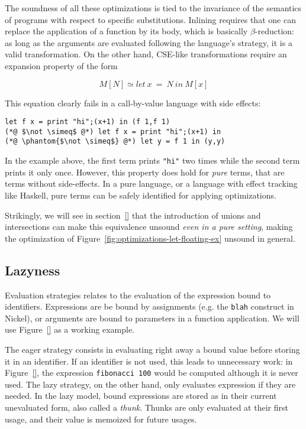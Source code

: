 \documentclass[sigplan,10pt,review,anonymous]{acmart}
\newcommand{\unsure}[2][1=]{}
\newcommand{\nickel}[1]{\lstinline[language=nickel]{#1}}
\begin{document}
The soundness of all these optimizations is tied to the invariance of the
semantics of programs with respect to specific substitutions. Inlining requires
that one can replace the application of a function by its body, which is
basically $\beta$-reduction: as long as the arguments are evaluated following
the language's strategy, it is a valid transformation. On the other hand,
CSE-like transformations require an expansion property of the form

$$M[N] \simeq let~x~=~N~in~M[x]$$

This equation clearly fails in a call-by-value language with side effects:

\begin{lstlisting}[language=Nickel]
let f x = print "hi";(x+1) in (f 1,f 1)
(*@ $\not \simeq$ @*) let f x = print "hi";(x+1) in
(*@ \phantom{$\not \simeq$} @*) let y = f 1 in (y,y)
\end{lstlisting}

In the example above, the first term prints \nickel{"hi"} two times while the
second term prints it only once. However, this property does hold for
\emph{pure} terms, that are terms without side-effects. In a pure language, or a
language with effect tracking like Haskell, pure terms can be safely identified for applying
optimizations.

Strikingly, we will see in section~\ref{} that the introduction of unions and
intersections can make this equivalence  unsound \emph{even in a
pure setting}, making the optimization of
Figure~\ref{fig:optimizations-let-floating-ex} unsound in general.

\unsure{Should we tease already here that unions and intersections break this
even for pure terms?}

\subsection*{Lazyness}
Evaluation strategies relates to the evaluation of the expression bound to
identifiers. Expressions are be bound by assignments (e.g. the \nickel{blah} construct in Nickel), or arguments are bound to
parameters in a function application. We will use Figure~\ref{} as a working
example.

The eager strategy consists in evaluating right away a bound value before
storing it in an identifier. If an identifier is not used, this leads to
unnecessary work: in Figure~\ref{}, the expression \nickel{fibonacci 100} would
be computed although it is never used. The lazy strategy, on the other hand,
only evaluates expression if they are needed. In the lazy model, bound
expressions are stored as in their current unevaluated form, also called a
\emph{thunk}. Thunks are only evaluated at their first usage, and their value is
memoized for future usages.
\end{document}
